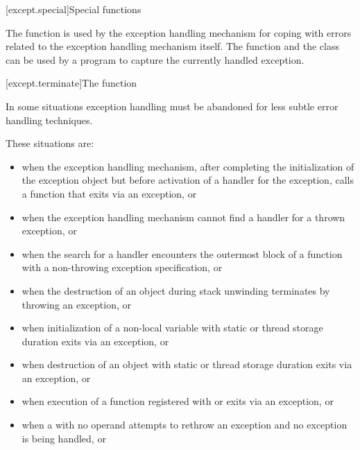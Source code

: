 [except.special]{Special functions}

\pnum
The function 
is used by the exception
handling mechanism for coping with errors related to the exception handling
mechanism itself. The function
 and the class
 can be used by a program to
capture the currently handled exception.

[except.terminate]{The  function}

\pnum
{}%
In some situations exception handling must be abandoned
for less subtle error handling techniques.
\begin{note}
These situations are:
%
\begin{itemize}
\item%
when the exception handling mechanism, after completing
the initialization of the exception object
but before
activation of a handler for the exception,
calls a function that exits
via an exception, or

\item%
when the exception handling mechanism cannot find a handler for a thrown exception, or

\item when the search for a handler encounters the
outermost block of a function
with a non-throwing exception specification, or

\item%
when the destruction of an object during stack unwinding
terminates by throwing an exception, or

\item%
when initialization of a non-local
variable with static or thread storage duration
exits via an exception, or

\item%
when destruction of an object with static or thread storage duration exits
via an exception, or

\item%
when execution of a function registered with
 or 
exits via an exception, or

\item%
when a
with no operand attempts to rethrow an exception and no exception is being
handled, or


\end{itemize}
\end{note}
